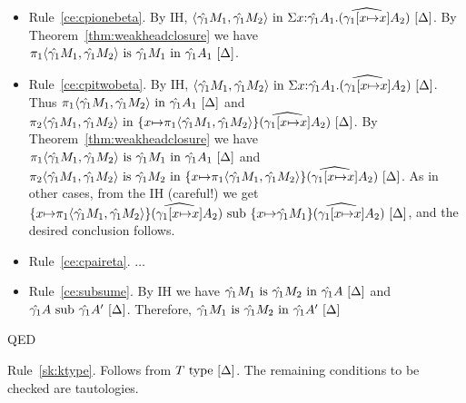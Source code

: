\documentclass{article}
\theoremstyle{break}
\newcommand{\qed}{\mbox{QED}}
\newenvironment{proof}{\noindent{\bf Proof:}\hspace*{0.5em}}{\hspace*{\fill}\qed}
\begin{document}
\begin{proof}
\begin{itemize}
\item Rule~\ref{ce:cpionebeta}.
By IH,
${\langle{\hat{\gamma_1}M_1},{\hat{\gamma_1}M_2}\rangle}\mathrm{\ in\ }{\Sigma x{:}\hat{\gamma_1}A_1.(\widehat{\gamma_1[x{\mapsto}x]}A_2)}\ [\Delta]$. 
By Theorem~\ref{thm:weakheadclosure} we have
${{\pi_{1}}{\langle{\hat{\gamma_1}M_1},{\hat{\gamma_1}M_2}\rangle}}\mathrm{\ is\ }{\hat{\gamma_1}M_1}\mathrm{\ in\ }{\hat{\gamma_1}A_1}\ [\Delta]$.

\item Rule~\ref{ce:cpitwobeta}.
By IH,
${\langle{\hat{\gamma_1}M_1},{\hat{\gamma_1}M_2}\rangle}\mathrm{\ in\ }{\Sigma x{:}\hat{\gamma_1}A_1.(\widehat{\gamma_1[x{\mapsto}x]}A_2)}\ [\Delta]$. 
Thus
${{\pi_{1}}{\langle{\hat{\gamma_1}M_1},{\hat{\gamma_1}M_2}\rangle}}\mathrm{\ in\ }{\hat{\gamma_1}A_1}\ [\Delta]$ and
${{\pi_{2}}{\langle{\hat{\gamma_1}M_1},{\hat{\gamma_1}M_2}\rangle}}\mathrm{\ in\ }{\{x{\mapsto}{\pi_{1}}{\langle{\hat{\gamma_1}M_1},{\hat{\gamma_1}M_2}\rangle}\}{(\widehat{\gamma_1[x{\mapsto}x]}A_2)}}\ [\Delta]$.
By Theorem~\ref{thm:weakheadclosure} we have
${{\pi_{1}}{\langle{\hat{\gamma_1}M_1},{\hat{\gamma_1}M_2}\rangle}}\mathrm{\ is\ }{\hat{\gamma_1}M_1}\mathrm{\ in\ }{\hat{\gamma_1}A_1}\ [\Delta]$ 
and
${{\pi_{2}}{\langle{\hat{\gamma_1}M_1},{\hat{\gamma_1}M_2}\rangle}}\mathrm{\ is\ }{\hat{\gamma_1}M_2}\mathrm{\ in\ }{\{x{\mapsto}{\pi_{1}}{\langle{\hat{\gamma_1}M_1},{\hat{\gamma_1}M_2}\rangle}\}{(\widehat{\gamma_1[x{\mapsto}x]}A_2)}}\ [\Delta]$.
As in other cases, from the IH (careful!) we get
${\{x{\mapsto}{\pi_{1}}{\langle{\hat{\gamma_1}M_1},{\hat{\gamma_1}M_2}\rangle}\}{(\widehat{\gamma_1[x{\mapsto}x]}A_2)}}\mathrm{\ sub\ }{\{x{\mapsto}\hat{\gamma_1}M_1\}{(\widehat{\gamma_1[x{\mapsto}x]}A_2)}}\ [\Delta]$,
and the desired conclusion follows.

\item Rule~\ref{ce:cpaireta}.
$\ldots$

\item Rule~\ref{ce:subsume}.
By IH we have
${\hat{\gamma_1}M_1}\mathrm{\ is\ }{\hat{\gamma_1}M_2}\mathrm{\ in\ }{\hat{\gamma_1}A}\ [\Delta]$
and
${\hat{\gamma_1}A}\mathrm{\ sub\ }{\hat{\gamma_1}A'}\ [\Delta]$.
Therefore,
${\hat{\gamma_1}M_1}\mathrm{\ is\ }{\hat{\gamma_1}M_2}\mathrm{\ in\ }{\hat{\gamma_1}A'}\ [\Delta]$

\end{itemize} 
\end{proof}


\iffalse

\item Rule~\ref{sk:ktype}.  Follows from
${T}\mathrm{\ type\ }[\Delta]$.
The remaining conditions to be checked are tautologies.
\end{document}
